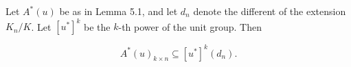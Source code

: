 Let $A^*(u)$ be as in Lemma 5.1, and let $d_n$ denote the different of the extension $K_n/K$. Let $[u^*]^k$ be the $k$-th power of the unit group. Then

$$
A^*(u)_{k \times n} \subseteq [u^*]^k(d_n).
$$
